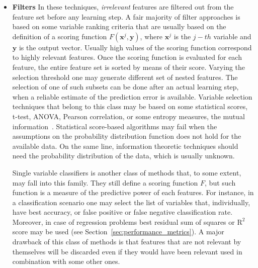 	\begin{itemize}
		
		\item[] \textbf{Filters}
		In these techniques, \textit{irrelevant} features are filtered out from the feature set before any learning step.
		A fair majority of filter approaches is based on some variable ranking criteria that are usually based on the definition of a scoring function $F(\bm{x}^{j}, \bm{y})$, where $\bm{x}^{j}$ is the $j-th$ variable and $\bm{y}$ is the output vector. Usually high values of the scoring function correspond to highly relevant features. Once the scoring function is evaluated for each feature, the entire feature set is sorted by means of their score. Varying the selection threshold one may generate different set of nested features. The selection of one of such subsets can be done after an actual learning step, \ie when a reliable estimate of the prediction error is available.
		Variable selection techniques that belong to this class may be based on some statistical scores, \eg t-test, ANOVA, Pearson correlation, or some entropy measures, \eg the mutual information~\cite{everitt2006cambridge}. Statistical score-based algorithms may fail when the assumptions on the probability distribution function does not hold for the available data. On the same line, information theoretic techniques should need the probability distribution of the data, which is usually unknown.
		
		Single variable classifiers is another class of methods that, to some extent, may fall into this family. They still define a scoring function $F$, but such function is a measure of the predictive power of each features. For instance, in a classification scenario one may select the list of variables that, individually, have best accuracy, or false positive or false negative classification rate. Moreover, in case of regression problems best residual sum of squares or $\text{R}^2$ score may be used  (see Section~\ref{sec:performance_metrics}). A major drawback of this class of methods is that features that are not relevant by themselves will be discarded even if they would have been relevant used in combination with some other ones.
		

\end{itemize}
